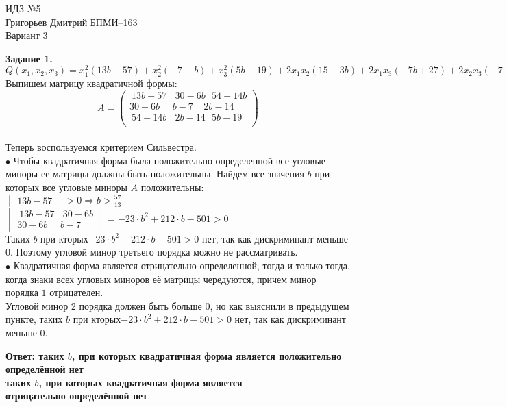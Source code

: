 \documentclass[12pt,a4paper]{scrartcl}
\begin{document}
	\begin{center}	
		ИДЗ №5\\
		Григорьев Дмитрий БПМИ--163\\
		Вариант 3
	\end{center}
	\textbf{Задание 1.} \\
	$Q(x_1, x_2, x_3) = x_1^2(13b - 57) + x_2^2(-7 + b) + x_3^2(5b - 19) + 2x_1x_2(15 - 3b) + 2x_1x_3(-7b + 27) + 2x_2x_3(-7 + b)$ \\
	Выпишем матрицу квадратичной формы:\\
	$$A = \begin{pmatrix}
	~13b - 57~~~~30 - 6b~~~54 - 14b\\
	30 - 6b~~~~~~b - 7~~~~~2b - 14\\
	~54 - 14b~~~~2b - 14~~~5b - 19\\
	\end{pmatrix}$$\\
	Теперь воспользуемся критерием Сильвестра. \\
	$\bullet$ Чтобы квадратичная форма была положительно определенной все угловые миноры ее матрицы должны быть положительны. Найдем все значения $b$ при которых все угловые миноры $A$ положительны:\\
	$\begin{vmatrix}
	13b - 57
	\end{vmatrix} > 0 \Rightarrow b > \frac{57}{13}$ \\
	$\begin{vmatrix}
	~13b - 57~~~~30 - 6b\\
	30 - 6b~~~~~~b - 7
	\end{vmatrix} = -23 \cdot b^2+212\cdot b-501 > 0$\\
	 Таких $b$ при кторых$-23 \cdot b^2+212 \cdot b-501 > 0$ нет, так как дискриминант меньше 0. Поэтому угловой минор третьего порядка можно не рассматривать.\\
	$\bullet$ Квадратичная форма является отрицательно определенной, тогда и только тогда, когда знаки всех угловых миноров её матрицы чередуются, причем минор порядка $1$ отрицателен. \\
	Угловой минор 2 порядка должен быть больше 0, но как выяснили в предыдущем пункте, таких $b$ при кторых$-23 \cdot b^2+212 \cdot b-501 > 0$ нет, так как дискриминант меньше 0.
	\begin{flushright}	
		\textbf{Ответ: таких $b$, при которых квадратичная форма является положительно определённой нет\\
		 таких $b$, при которых квадратичная форма является\\ отрицательно определённой нет\\} 
	\end{flushright}
	
\end{document}
